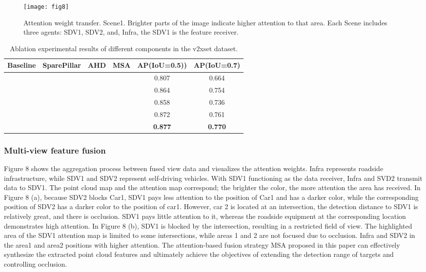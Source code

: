 \documentclass[lettersize,journal]{IEEEtran}
\begin{document}
\begin{figure*}[!t]
\texttt{[image: fig8]}
\caption{Attention weight transfer. Scene1. Brighter parts of the image indicate higher attention to that area. Each Scene includes three agents: SDV1, SDV2, and, Infra, the SDV1 is the feature receiver.}
\label{fig_8}
\end{figure*}

\begin{table}[!t]
\renewcommand\arraystretch{1.8}
\tabcolsep=0.17cm

\caption{Ablation experimental results of different components in the v2xset dataset.}
\centering
\label{tab4}
\begin{tabular}{ c c c c c c } \hline
Baseline &  SparePillar & AHD & MSA & AP(IoU=0.5)) & AP(IoU=0.7)\\ \hline
 & & & & 0.807 & 0.664\\
 & & & & 0.864 & 0.754\\
 & && & 0.858 & 0.736\\
 & & & & 0.872 & 0.761\\
 & & & & \textbf{0.877} & \textbf{0.770}\\\hline
\end{tabular}
\end{table}
\subsubsection{Multi-view feature fusion}
Figure 8 shows the aggregation process between fused view data and visualizes the attention weights. Infra represents roadside infrastructure, while SDV1 and SDV2 represent self-driving vehicles. With SDV1 functioning as the data receiver, Infra and SVD2 transmit data to SDV1. The point cloud map and the attention map correspond; the brighter the color, the more attention the area has received. In Figure 8 (a), because SDV2 blocks Car1, SDV1 pays less attention to the position of Car1 and has a darker color, while the corresponding position of SDV2 has a darker color to the position of car1. However, car 2 is located at an intersection, the detection distance to SDV1 is relatively great, and there is occlusion. SDV1 pays little attention to it, whereas the roadside equipment at the corresponding location demonstrates high attention. In Figure 8 (b), SDV1 is blocked by the intersection, resulting in a restricted field of view. The highlighted area of the SDV1 attention map is limited to some intersections, while areas 1 and 2 are not focused due to occlusion. Infra and SDV2 in the area1 and area2 positions with higher attention. The attention-based fusion strategy MSA proposed in this paper can effectively synthesize the extracted point cloud features and ultimately achieve the objectives of extending the detection range of targets and controlling occlusion.
\end{document}

